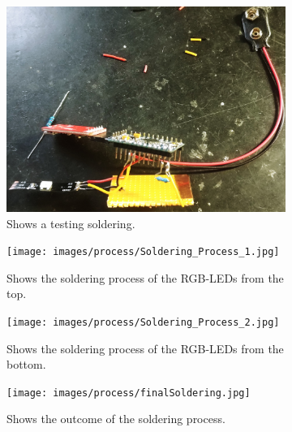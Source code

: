 \documentclass[00_doc.tex]{subfiles}
\begin{document}
    \begin{figure}[H]
        \centering
        \begin{subfigure}{.45\textwidth}
        \centering
        \includegraphics[width=0.8\linewidth]{images/process/solderingProcess.jpg}
        \caption{Shows a testing soldering.}
        \label{fig:solderingProcess_0}
        \vspace{6mm}
        \end{subfigure}
        \begin{subfigure}{.45\textwidth}
            \centering
            \texttt{[image: images/process/Soldering\_Process\_1.jpg]}
            \caption{Shows the soldering process of the RGB-LEDs from the top.}
            \label{fig:solderingProcess_1}
            \vspace{6mm}
        \end{subfigure}
        \hspace{1mm}
        \begin{subfigure}{.45\textwidth}
            \centering
            \texttt{[image: images/process/Soldering\_Process\_2.jpg]}
            \caption{Shows the soldering process of the RGB-LEDs from the bottom.}
            \label{fig:solderingProcess_2}
            \vspace{6mm}
        \end{subfigure}
        \begin{subfigure}{.45\textwidth}
            \centering
            \texttt{[image: images/process/finalSoldering.jpg]}
            \caption{Shows the outcome of the soldering process.} 
            \label{fig:finalSoldering}
            \vspace{6mm}
        \end{subfigure}
        \begin{subfigure}{.45\textwidth}

\end{subfigure}
\end{figure}
\end{document}
